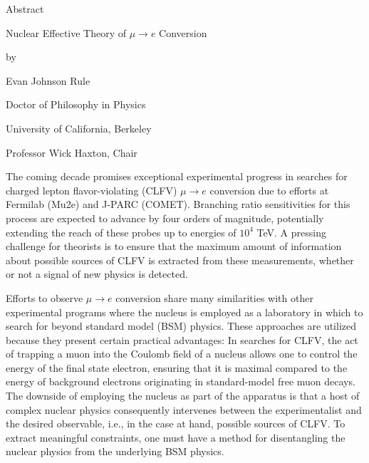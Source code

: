 \documentclass{book}[letterpaper,12pt]
\begin{document}
\newpage
{}
\begin{center}
Abstract

\vspace{1cm}
Nuclear Effective Theory of $\mu\rightarrow e$ Conversion

\vspace{0.5cm}
by

\vspace{0.5cm}
Evan Johnson Rule

\vspace{0.5cm}
Doctor of Philosophy in Physics

\vspace{0.5cm}
University of California, Berkeley

\vspace{0.5cm}
Professor Wick Haxton, Chair
\end{center}
The coming decade promises exceptional experimental progress in searches for charged lepton flavor-violating (CLFV) $\mu\rightarrow e$ conversion due to efforts at Fermilab (Mu2e) and J-PARC (COMET). Branching ratio sensitivities for this process are expected to advance by four orders of magnitude, potentially extending the reach of these probes up to energies of $10^4$ TeV. A pressing challenge for theorists is to ensure that the maximum amount of information about possible sources of CLFV is extracted from these measurements, whether or not a signal of new physics is detected. 

Efforts to observe $\mu\rightarrow e$ conversion share many similarities with other experimental programs where the nucleus is employed as a laboratory in which to search for beyond standard model (BSM) physics. These approaches are utilized because they present certain practical advantages: In searches for CLFV, the act of trapping a muon into the Coulomb field of a nucleus allows one to control the energy of the final state electron, ensuring that it is maximal compared to the energy of background electrons originating in standard-model free muon decays. The downside of employing the nucleus as part of the apparatus is that a host of complex nuclear physics consequently intervenes between the experimentalist and the desired observable, i.e., in the case at hand, possible sources of CLFV. To extract meaningful constraints, one must have a method for disentangling the nuclear physics from the underlying BSM physics.
\end{document}
